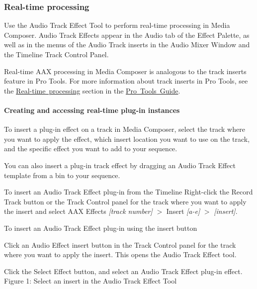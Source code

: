 \hypertarget{a00831_subsection__real-time_processing}{}\subsubsection{Real-\/time processing}\label{a00831_subsection__real-time_processing}
 Use the Audio Track Effect Tool to perform real-\/time processing in Media Composer. Audio Track Effects appear in the Audio tab of the Effect Palette, as well as in the menus of the Audio Track inserts in the Audio Mixer Window and the Timeline Track Control Panel.

Real-\/time A\+AX processing in Media Composer is analogous to the track inserts feature in Pro Tools. For more information about track inserts in Pro Tools, see the \mbox{\hyperlink{a00830_subsection__realtime_processing}{Real-\/time processing}} section in the \mbox{\hyperlink{a00830}{Pro Tools Guide}}.

\hypertarget{a00831_subsubsectin__media_composer_guide__inserting_real-time}{}\paragraph{Creating and accessing real-\/time plug-\/in instances}\label{a00831_subsubsectin__media_composer_guide__inserting_real-time}
 To insert a plug-\/in effect on a track in Media Composer, select the track where you want to apply the effect, which insert location you want to use on the track, and the specific effect you want to add to your sequence.

You can also insert a plug-\/in track effect by dragging an Audio Track Effect template from a bin to your sequence.

To insert an Audio Track Effect plug-\/in from the Timeline  Right-\/click the Record Track button or the Track Control panel for the track where you want to apply the insert and select A\+AX Effects {\itshape \mbox{[}track number\mbox{]}} $>$ Insert {\itshape \mbox{[}a-\/e\mbox{]}} $>$ {\itshape \mbox{[}insert\mbox{]}}.

To insert an Audio Track Effect plug-\/in using the insert button  
\begin{DoxyEnumerate}
\item Click an Audio Effect insert button in the Track Control panel for the track where you want to apply the insert. This opens the Audio Track Effect tool.  
\item Click the Select Effect button, and select an Audio Track Effect plug-\/in effect.   Figure 1\+: Select an insert in the Audio Track Effect Tool  
\end{DoxyEnumerate}

